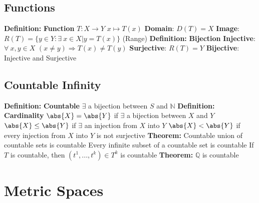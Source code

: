 \documentclass[14pt]{extarticle}
\def\Definition{{\color{blue} \textbf{Definition:} }}
\def\Theorem{{\color{red} \textbf{Theorem:} }}
\begin{document}
\begin{outline}
		\subsection*{Functions}
		\1	\Definition \textbf{Function}
			\2	$T : X \rightarrow Y$
			\2	$x \mapsto T(x)$
			\2	\textbf{Domain}: $D(T) = X$
			\2	\textbf{Image}: $R(T) = \{y \in Y : \exists~x \in X | y = T(x)\}$ (Range)
		\1	\Definition \textbf{Bijection}
			\2	\textbf{Injective}: $\forall~x,y \in X$ $(x \ne y) \Rightarrow T(x) \ne T(y)$ 
			\2	\textbf{Surjective}: $R(T) = Y$
			\2	\textbf{Bijective}: Injective and Surjective
		\subsection*{Countable Infinity}
		\1	\Definition \textbf{Countable}
			\2	$\exists$ a bijection between $S$ and $\mathbb{N}$
		\1	\Definition \textbf{Cardinality}
			\2	$\abs{X} = \abs{Y}$ if $\exists$ a bijection between $X$ and $Y$
			\2	$\abs{X} \le \abs{Y}$ if $\exists$ an injection from $X$ into $Y$
			\2	$\abs{X} < \abs{Y}$ if every injection from $X$ into $Y$ is not surjective
		\1	\Theorem Countable union of countable sets is countable
			\2	Every infinite subset of a countable set is countable
			\2	If $T$ is countable, then $(t^1,...,t^k) \in T^k$ is countable
		\1 \Theorem $\mathbb{Q}$ is countable

	\section*{Metric Spaces}

\end{outline}
\end{document}
